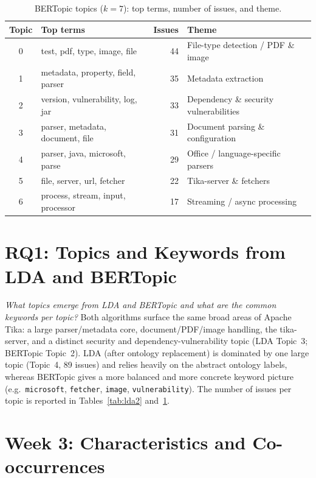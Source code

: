 \documentclass[11pt,a4paper]{report}
\begin{document}
\begin{table}[H]
  \centering
  \caption{BERTopic topics ($k=7$): top terms, number of issues, and theme.}
  \label{tab:bert}
  \begin{tabular}{clrl}
    \toprule
    \textbf{Topic} & \textbf{Top terms} & \textbf{Issues} & \textbf{Theme} \\
    \midrule
    0 & test, pdf, type, image, file      & 44 & File-type detection / PDF \& image \\
    1 & metadata, property, field, parser & 35 & Metadata extraction \\
    2 & version, vulnerability, log, jar  & 33 & Dependency \& security vulnerabilities \\
    3 & parser, metadata, document, file  & 31 & Document parsing \& configuration \\
    4 & parser, java, microsoft, parse    & 29 & Office / language-specific parsers \\
    5 & file, server, url, fetcher        & 22 & Tika-server \& fetchers \\
    6 & process, stream, input, processor & 17 & Streaming / async processing \\
    \bottomrule
  \end{tabular}
\end{table}

\section{RQ1: Topics and Keywords from LDA and BERTopic}
\emph{What topics emerge from LDA and BERTopic and what are the common keywords
per topic?} Both algorithms surface the same broad areas of Apache Tika: a large
parser/metadata core, document/PDF/image handling, the tika-server, and a
distinct security and dependency-vulnerability topic (LDA Topic~3; BERTopic
Topic~2). LDA (after ontology replacement) is dominated by one large topic
(Topic~4, 89 issues) and relies heavily on the abstract ontology labels, whereas
BERTopic gives a more balanced and more concrete keyword picture (e.g.\
\texttt{microsoft}, \texttt{fetcher}, \texttt{image}, \texttt{vulnerability}).
The number of issues per topic is reported in Tables~\ref{tab:lda2}
and~\ref{tab:bert}.

\section{Week 3: Characteristics and Co-occurrences}
\end{document}
